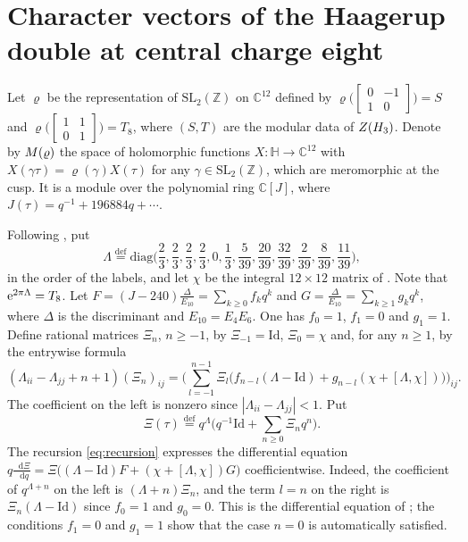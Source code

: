 \documentclass[leqno]{article}
\newcommand{\Cbb}{\ensuremath{\mathbb{C}}}
\newcommand{\diag}{\mathrm{diag}}
\let\cal\relax
\newcommand{\cal}{\mathcal}
\newcommand{\Z}{\ensuremath{\mathbb{Z}}}
\newcommand{\Id}{\mathrm{Id}}
\renewcommand{\geq}{\ensuremath{\geqslant}}
\newcommand{\co}{\colon}
\let\i\relax
\newcommand{\i}{\mathrm{i}}
\newcommand{\ov}{\overset}
\renewcommand{\d}{\mathop{}\mathopen{}\mathrm{d}}
\newcommand{\e}{\mathrm{e}}
\renewcommand{\d}{\mathop{}\mathopen{}\mathrm{d}}
\numberwithin{equation}{section}
\begin{document}
\section{Character vectors of the Haagerup double at central charge eight}
\label{sec:c8}

Let $\varrho$ be the representation of $\mathrm{SL}_2(\Z)$ on $\Cbb^{12}$ defined by $\varrho\big(\begin{bmatrix}0&-1\\1&0\end{bmatrix}\big) = S$ and $\varrho\big(\begin{bmatrix}1&1\\0&1\end{bmatrix}\big) = T_8$, where $(S,T)$ are the modular data of $Z(\cal H_3)$. Denote by $\cal M(\varrho)$ the space of holomorphic functions $X \co \mathbb H \to \Cbb^{12}$ with $X(\gamma\tau) = \varrho(\gamma)X(\tau)$ for any $\gamma \in \mathrm{SL}_2(\Z)$, which are meromorphic at the cusp. It is a module over the polynomial ring $\Cbb[J]$, where $J(\tau) = q^{-1}+196884q+\cdots$.

Following \cite[equation (2.7) pp.~21--22]{EvG11}, put
\begin{equation}
\label{eq:Lambda}
\Lambda \ov{\mathrm{def}}{=} \diag\Big(\frac{2}{3},\frac{2}{3},\frac{2}{3},\frac{2}{3},0,\frac{1}{3},\frac{5}{39},\frac{20}{39},\frac{32}{39},\frac{2}{39},\frac{8}{39},\frac{11}{39}\Big),
\end{equation}
in the order of the labels, and let $\chi$ be the integral $12 \times 12$ matrix of \cite[equation (2.7)]{EvG11}. Note that $\e^{2\pi\i\Lambda} = T_8$. Let $F = (J-240)\frac{\Delta}{E_{10}} = \sum_{k \geq 0}f_kq^k$ and $G = \frac{\Delta}{E_{10}} = \sum_{k \geq 1}g_kq^k$, where $\Delta$ is the discriminant and $E_{10} = E_4E_6$. One has $f_0 = 1$, $f_1 = 0$ and $g_1 = 1$. Define rational matrices $\Xi_n$, $n \geq -1$, by $\Xi_{-1} = \Id$, $\Xi_0 = \chi$ and, for any $n \geq 1$, by the entrywise formula
\begin{equation}
\label{eq:recursion}
(\Lambda_{ii}-\Lambda_{jj}+n+1)(\Xi_n)_{ij}
 = \bigg(\sum_{l = -1}^{n-1}\Xi_l\big(f_{n-l}(\Lambda-\Id)+g_{n-l}(\chi+[\Lambda,\chi])\big)\bigg)_{ij}.
\end{equation}
The coefficient on the left is nonzero since $|\Lambda_{ii}-\Lambda_{jj}| < 1$. Put
\begin{equation}
\label{eq:Xi}
\Xi(\tau) \ov{\mathrm{def}}{=} q^{\Lambda}\Big(q^{-1}\Id+\sum_{n \geq 0}\Xi_nq^n\Big).
\end{equation}
The recursion \eqref{eq:recursion} expresses the differential equation $q\frac{\d\Xi}{\d q} = \Xi\big((\Lambda-\Id)F+(\chi+[\Lambda,\chi])G\big)$ coefficientwise. Indeed, the coefficient of $q^{\Lambda+n}$ on the left is $(\Lambda+n)\Xi_n$, and the term $l = n$ on the right is $\Xi_n(\Lambda-\Id)$ since $f_0 = 1$ and $g_0 = 0$. This is the differential equation of \cite[Section 3]{BaG07}; the conditions $f_1 = 0$ and $g_1 = 1$ show that the case $n = 0$ is automatically satisfied.
\end{document}
